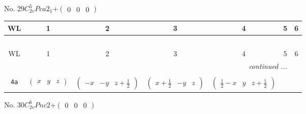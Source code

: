 \documentclass[fleqn,9pt,landscape]{jsarticle}
\begin{document}
\newpage
No. 29\quad$C_{2v}^{5}$\quad$Pca2_1$\quad[ orthorhombic ]\quad$+\begin{pmatrix} 0 & 0 & 0 \end{pmatrix}$
\begin{center}
\renewcommand{\arraystretch}{1.2}
\begin{longtable}{ccccccc}
 \hline \hline
WL & 1 & 2 & 3 & 4 & 5 & 6 \\ \hline \endfirsthead

\multicolumn{6}{l}{\tablename\ \thetable{}} \\
 \hline \hline
WL & 1 & 2 & 3 & 4 & 5 & 6 \\ \hline \endhead

 \hline \hline
\multicolumn{6}{r}{\footnotesize\it continued ...} \\ \endfoot

 \hline \hline
\multicolumn{6}{r}{} \\ \endlastfoot

{\tt 4a} & $ \begin{pmatrix} x & y & z \end{pmatrix} $ & $ \begin{pmatrix} - x & - y & z + \frac{1}{2} \end{pmatrix} $ & $ \begin{pmatrix} x + \frac{1}{2} & - y & z \end{pmatrix} $ & $ \begin{pmatrix} \frac{1}{2} - x & y & z + \frac{1}{2} \end{pmatrix} $ \\
\end{longtable}
\end{center}
\newpage
No. 30\quad$C_{2v}^{6}$\quad$Pnc2$\quad[ orthorhombic ]\quad$+\begin{pmatrix} 0 & 0 & 0 \end{pmatrix}$
\end{document}
